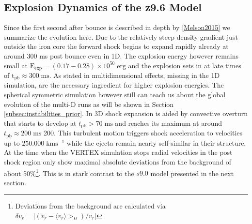 \documentclass[fleqn,usenatbib]{mnras}
\newcommand{\vertex}{\textsc{V{\footnotesize ERTEX}}\xspace}
\begin{document}
\subsection{Explosion Dynamics of the z9.6 Model}
Since the first second after bounce is described in depth by \ref{Melson2015} we summarize the evolution here. 
Due to the relatively steep density gradient just outside the iron core the forward shock begins to expand rapidly already at around 300 ms post bounce even in 1D. The explosion energy however remains small at $\mathrm{E_{exp}}=(0.17-0.28)\times 10^{50} \; \mathrm{erg}$ and the explosion sets in at late times of $\mathrm{t_{pb}}\approx 300\;\mathrm{ms}$. As stated in \cite{Melson2015} multidimensional effects, missing in the 1D simulation, are the necessary ingredient for higher explosion energies. The spherical symmetric simulation however still can teach us about the global evolution of the multi-D runs as will be shown in Section \ref{subsec:instabilities_prior}.
In 3D shock expansion is aided by convective overturn that starts to develop at $t_{\mathrm{pb}} > 70\;\mathrm{ms} $ and reaches its maximum at around $t_{\mathrm{pb}} \approx 200\;\mathrm{ms}$ 200. This turbulent motion triggers shock acceleration to velocities up to $\mathrm{250.000\;km s^{-1}}$ while the ejecta remain nearly self-similar in their structure. 
At the time when the \vertex simulation stops radial velocities in the post shock region only show maximal absolute deviations from the background of about 50\%\footnote{Deviations from the background are calculated via $\delta v_r = | (v_r - \langle v_r \rangle>_{\Omega}) / v_r |$}. This is in stark contrast to the $s9.0$ model presented in the next section. 
\end{document}
